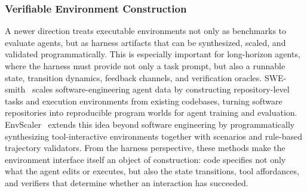 \subsubsection{Verifiable Environment Construction}
A newer direction treats executable environments not only as
benchmarks to evaluate agents, but as harness artifacts that can
be synthesized, scaled, and validated programmatically. This is
especially important for long-horizon agents, where the harness
must provide not only a task prompt, but also a runnable state,
transition dynamics, feedback channels, and verification oracles.
SWE-smith~\cite{yang2025swesmithscalingdatasoftware} scales
software-engineering agent data by constructing repository-level
tasks and execution environments from existing codebases, turning
software repositories into reproducible program worlds for agent
training and evaluation. EnvScaler~\cite{song2026envscalerscalingtoolinteractiveenvironments}
extends this idea beyond software engineering by programmatically
synthesizing tool-interactive environments together with scenarios
and rule-based trajectory validators. From the harness perspective,
these methods make the environment interface itself an object of
construction: code specifies not only what the agent edits or
executes, but also the state transitions, tool affordances, and
verifiers that determine whether an interaction has succeeded.


